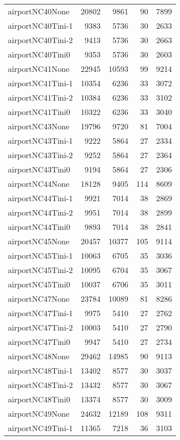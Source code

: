 \begin{longtable}{lrrrr}
airportNC40None & 20802 & 9861 & 90 & 7899 \\
airportNC40Tini-1 & 9383 & 5736 & 30 & 2633 \\
airportNC40Tini-2 & 9413 & 5736 & 30 & 2663 \\
airportNC40Tini0 & 9353 & 5736 & 30 & 2603 \\
airportNC41None & 22945 & 10593 & 99 & 9214 \\
airportNC41Tini-1 & 10354 & 6236 & 33 & 3072 \\
airportNC41Tini-2 & 10384 & 6236 & 33 & 3102 \\
airportNC41Tini0 & 10322 & 6236 & 33 & 3040 \\
airportNC43None & 19796 & 9720 & 81 & 7004 \\
airportNC43Tini-1 & 9222 & 5864 & 27 & 2334 \\
airportNC43Tini-2 & 9252 & 5864 & 27 & 2364 \\
airportNC43Tini0 & 9194 & 5864 & 27 & 2306 \\
airportNC44None & 18128 & 9405 & 114 & 8609 \\
airportNC44Tini-1 & 9921 & 7014 & 38 & 2869 \\
airportNC44Tini-2 & 9951 & 7014 & 38 & 2899 \\
airportNC44Tini0 & 9893 & 7014 & 38 & 2841 \\
airportNC45None & 20457 & 10377 & 105 & 9114 \\
airportNC45Tini-1 & 10063 & 6705 & 35 & 3036 \\
airportNC45Tini-2 & 10095 & 6704 & 35 & 3067 \\
airportNC45Tini0 & 10037 & 6706 & 35 & 3011 \\
airportNC47None & 23784 & 10089 & 81 & 8286 \\
airportNC47Tini-1 & 9975 & 5410 & 27 & 2762 \\
airportNC47Tini-2 & 10003 & 5410 & 27 & 2790 \\
airportNC47Tini0 & 9947 & 5410 & 27 & 2734 \\
airportNC48None & 29462 & 14985 & 90 & 9113 \\
airportNC48Tini-1 & 13402 & 8577 & 30 & 3037 \\
airportNC48Tini-2 & 13432 & 8577 & 30 & 3067 \\
airportNC48Tini0 & 13374 & 8577 & 30 & 3009 \\
airportNC49None & 24632 & 12189 & 108 & 9311 \\
airportNC49Tini-1 & 11365 & 7218 & 36 & 3103 \\

\end{longtable}
